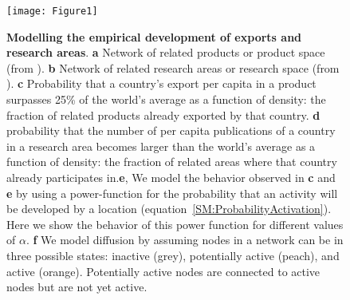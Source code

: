 \documentclass[preprint,superscriptaddress,floatfix]{article}
\begin{document}
\begin{figure}
    \centering
    \texttt{[image: Figure1]}
    \caption{\textbf{Modelling the empirical development of exports and research areas}. \textbf{a} Network of related products or product space (from \cite{hidalgo2007product}). \textbf{b} Network of related research areas or research space (from \cite{guevara2016research}). \textbf{c} Probability that a country's export per capita in a product surpasses 25\% of the world's average as a function of density: the fraction of related products already exported by that country. \textbf{d} probability that the number of per capita publications of a country in a research area becomes larger than the world's average as a function of density: the fraction of related areas where that country already participates in.\textbf{e}, We model the behavior observed in \textbf{c} and \textbf{e} by using a power-function for the probability that an activity will be developed by a location (equation~\ref{SM:ProbabilityActivation}). Here we show the behavior of this power function for different values of $\alpha$. \textbf{f} We model diffusion by assuming nodes in a network can be in three possible states: inactive (grey), potentially active (peach), and active (orange). Potentially active nodes are connected to active nodes but are not yet active.}
    \label{fig:Model}
\end{figure}
\end{document}
